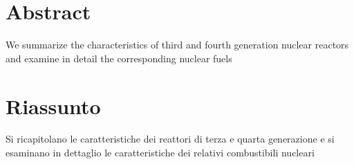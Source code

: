 \begingroup
\let\clearpage\relax
\let\cleardoublepage\relax
\let\cleardoublepage\relax

\chapter*{Abstract}
We summarize the characteristics of third and fourth generation nuclear
reactors and examine in detail the corresponding nuclear fuels 


\vfill

\chapter*{Riassunto}
Si ricapitolano le caratteristiche dei reattori di terza e quarta generazione
e si esaminano in dettaglio le caratteristiche dei relativi combustibili nucleari


\endgroup			

\vfil\begin{quotation}

\end{quotation}